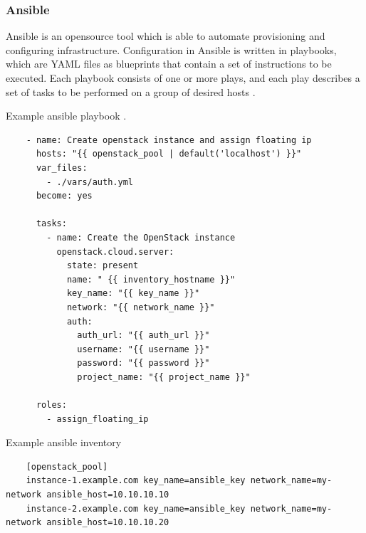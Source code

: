 \subsubsection{Ansible}
\label{sec:ansible}

Ansible is an opensource tool which is able to automate provisioning and configuring infrastructure. Configuration in Ansible is written in playbooks, which are YAML files as blueprints that contain a set of instructions to be executed. Each playbook consists of one or more plays, and each play describes a set of tasks to be performed on a group of desired hosts \cite{Ansible} \cite{AnsiblePlaybook}.

\begin{listing}[htb]
    \centering
    \caption{Example ansible playbook \cite{AnsibleOpenstack}.}
    \begin{verbatim}
    - name: Create openstack instance and assign floating ip
      hosts: "{{ openstack_pool | default('localhost') }}"
      var_files:
        - ./vars/auth.yml
      become: yes
  
      tasks:
        - name: Create the OpenStack instance
          openstack.cloud.server:
            state: present
            name: " {{ inventory_hostname }}"
            key_name: "{{ key_name }}"
            network: "{{ network_name }}"
            auth:
              auth_url: "{{ auth_url }}"
              username: "{{ username }}"
              password: "{{ password }}"
              project_name: "{{ project_name }}"
  
      roles:
        - assign_floating_ip

    \end{verbatim}
    \label{lst:exampleAnsiblePlaybook}
\end{listing}

\begin{listing}[htb]
    \centering
    \caption{Example ansible inventory \cite{AnsibleInventory} \cite{AnsibleOpenstack} \cite{AnsibleVars}}
    \begin{verbatim}
    [openstack_pool]
    instance-1.example.com key_name=ansible_key network_name=my-network ansible_host=10.10.10.10
    instance-2.example.com key_name=ansible_key network_name=my-network ansible_host=10.10.10.20
    \end{verbatim}
    \label{lst:exampleAnsibleInventory}
\end{listing}


